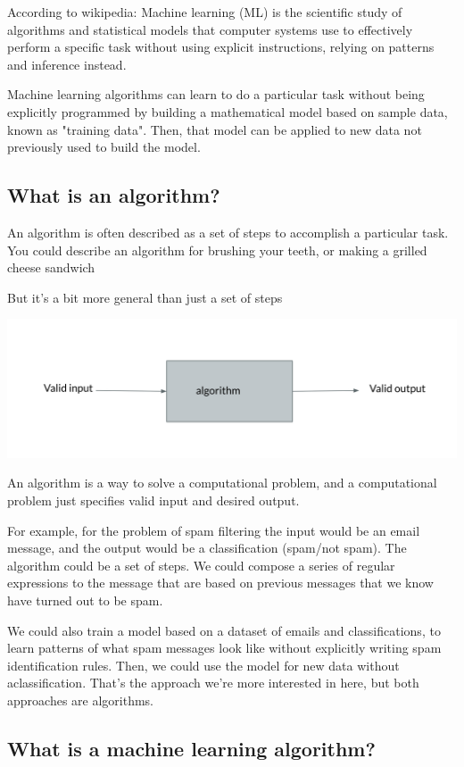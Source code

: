\documentclass[12pt]{article}
\begin{document}
According to wikipedia:
Machine learning (ML) is the scientific study of algorithms and statistical models that computer systems use to effectively perform a specific task without using explicit instructions, relying on patterns and inference instead.


Machine learning algorithms can learn to do a particular task without being explicitly programmed by building a mathematical model based on sample data, known as "training data". Then, that model can be applied to new data not previously used to build the model.

\subsection{What is an algorithm?}

An algorithm is often described as a set of steps to accomplish a particular task. You could describe an algorithm for brushing your teeth, or making a grilled cheese sandwich 

But it's a bit more general than just a set of steps 

\includegraphics[width={\textwidth}]{algo-abstract}


An algorithm is a way to solve a computational problem, and a computational problem just specifies valid input and desired output. 

For example, for the problem of spam filtering the input would be an email message, and the output would be a classification (spam/not spam). The algorithm could be a set of steps. We could compose a series of regular expressions to the message that are based on previous messages that we know have turned out to be spam. 

We could also train a model based on a dataset of emails and classifications, to learn patterns of what spam messages look like without explicitly writing spam identification rules. Then, we could use the model for new data without aclassification. That's the approach we're more interested in here, but both approaches are algorithms.

\subsection{What is a machine learning algorithm?}
\end{document}
